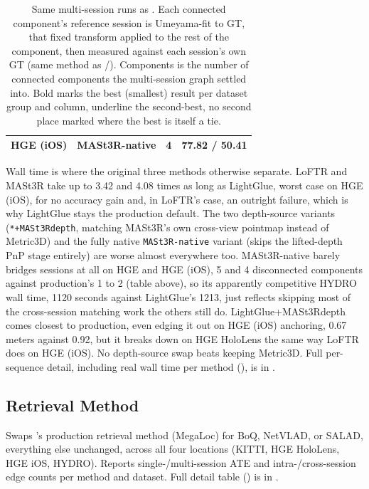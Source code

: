 \begin{table}[htb]
\begin{tabular*}{\textwidth}{@{\extracolsep{\fill}} llrr}
  HGE (iOS) & MASt3R-native & 4 & 77.82 / 50.41 \\
  \hline
  \end{tabular*}
  \caption[Ref-anchored consistency, all 6 PE methods]{Same multi-session runs as
    . Each connected component's reference session is Umeyama-fit
    to GT, that fixed transform applied to the rest of the component, then measured against each
    session's own GT (same method as /).
    Components is the number of connected components the multi-session graph settled into. Bold
    marks the best (smallest) result per dataset group and column, underline the second-best, no
    second place marked where the best is itself a tie.}
  \label{tab:ablation-pe-anchoring}
\end{table}

Wall time is where the original three methods otherwise separate. LoFTR and MASt3R take up to 3.42
and 4.08 times as long as LightGlue, worst case on HGE (iOS), for no accuracy gain and, in LoFTR's
case, an outright failure, which is why LightGlue stays the production default. The two
depth-source variants (\texttt{*+MASt3Rdepth}, matching MASt3R's own cross-view pointmap instead
of Metric3D) and the fully native \texttt{MASt3R-native} variant (skips the lifted-depth PnP stage
entirely) are worse almost everywhere too. MASt3R-native barely bridges sessions at all on HGE and
HGE (iOS), 5 and 4 disconnected components against production's 1 to 2 (table above), so its
apparently competitive HYDRO wall time, 1120 seconds against LightGlue's 1213, just reflects
skipping most of the cross-session matching work the others still do. LightGlue+MASt3Rdepth comes
closest to production, even edging it out on HGE (iOS) anchoring, 0.67 meters against 0.92, but it
breaks down on HGE HoloLens the same way LoFTR does on HGE (iOS). No depth-source swap beats
keeping Metric3D. Full per-sequence detail, including real wall time per method
(), is in .

\subsection{Retrieval Method}
\label{sec:experiments-ablation-retrieval}

Swaps 's production retrieval method (MegaLoc) for BoQ, NetVLAD, or
SALAD, everything else unchanged, across all four locations (KITTI, HGE HoloLens, HGE iOS,
HYDRO). Reports single-/multi-session ATE and intra-/cross-session edge counts per method and
dataset. Full detail table () is in
.

